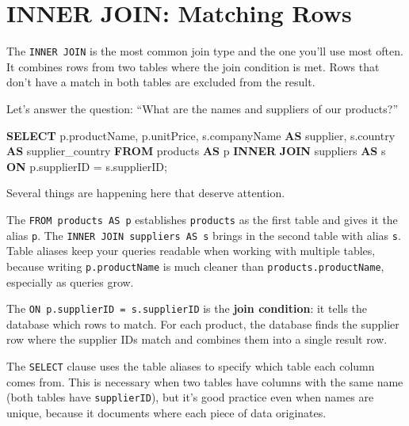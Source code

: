 \documentclass[
  letterpaper,
  DIV=11,
  numbers=noendperiod]{scrreprt}
\newenvironment{Shaded}{\begin{snugshade}}{\end{snugshade}}
\newcommand{\KeywordTok}[1]{\textcolor[rgb]{0.00,0.23,0.31}{\textbf{#1}}}
\newcommand{\NormalTok}[1]{\textcolor[rgb]{0.00,0.23,0.31}{#1}}
\newcommand{\OperatorTok}[1]{\textcolor[rgb]{0.37,0.37,0.37}{#1}}
\begin{document}
\section{INNER JOIN: Matching Rows}\label{inner-join-matching-rows}

The \texttt{INNER\ JOIN} is the most common join type and the one you'll
use most often. It combines rows from two tables where the join
condition is met. Rows that don't have a match in both tables are
excluded from the result.

Let's answer the question: ``What are the names and suppliers of our
products?''

\begin{codelisting}

\caption{\texttt{duckdb}}

\begin{Shaded}
\begin{Highlighting}[]
\KeywordTok{SELECT}
\NormalTok{    p.productName,}
\NormalTok{    p.unitPrice,}
\NormalTok{    s.companyName }\KeywordTok{AS}\NormalTok{ supplier,}
\NormalTok{    s.country }\KeywordTok{AS}\NormalTok{ supplier\_country}
\KeywordTok{FROM}\NormalTok{ products }\KeywordTok{AS}\NormalTok{ p}
\KeywordTok{INNER} \KeywordTok{JOIN}\NormalTok{ suppliers }\KeywordTok{AS}\NormalTok{ s}
    \KeywordTok{ON}\NormalTok{ p.supplierID }\OperatorTok{=}\NormalTok{ s.supplierID;}
\end{Highlighting}
\end{Shaded}

\end{codelisting}

Several things are happening here that deserve attention.

The \texttt{FROM\ products\ AS\ p} establishes \texttt{products} as the
first table and gives it the alias \texttt{p}. The
\texttt{INNER\ JOIN\ suppliers\ AS\ s} brings in the second table with
alias \texttt{s}. Table aliases keep your queries readable when working
with multiple tables, because writing \texttt{p.productName} is much
cleaner than \texttt{products.productName}, especially as queries grow.

The \texttt{ON\ p.supplierID\ =\ s.supplierID} is the \textbf{join
condition}: it tells the database which rows to match. For each product,
the database finds the supplier row where the supplier IDs match and
combines them into a single result row.

The \texttt{SELECT} clause uses the table aliases to specify which table
each column comes from. This is necessary when two tables have columns
with the same name (both tables have \texttt{supplierID}), but it's good
practice even when names are unique, because it documents where each
piece of data originates.
\end{document}
